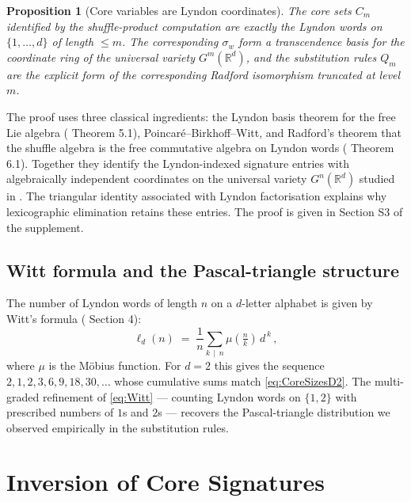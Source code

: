 \documentclass[11pt,english]{article}
\newtheorem{proposition}[theorem]{Proposition}
\theoremstyle{definition}
\theoremstyle{remark}
\begin{document}
\begin{proposition}[Core variables are Lyndon coordinates]
\label{prop:core-is-lyndon} The core sets $C_{m}$ identified by
the shuffle-product computation are exactly the Lyndon words on $\{1,\ldots,d\}$
of length $\leq m$. The corresponding $\sigma_{w}$ form a transcendence
basis for the coordinate ring of the universal variety $G^{m}(\mathbb{R}^{d})$,
and the substitution rules $Q_{m}$ are the explicit form of the corresponding
Radford isomorphism truncated at level $m$.
\end{proposition}

The proof uses three classical ingredients: the Lyndon basis theorem
for the free Lie algebra (\cite{Reutenauer} Theorem 5.1), Poincaré--Birkhoff--Witt,
and Radford's theorem that the shuffle algebra is the free commutative
algebra on Lyndon words (\cite{Reutenauer} Theorem 6.1). Together
they identify the Lyndon-indexed signature entries with algebraically
independent coordinates on the universal variety $G^{n}(\mathbb{R}^{d})$
studied in \cite{varieties}. The triangular identity associated with
Lyndon factorisation explains why lexicographic elimination retains
these entries. The proof is given in Section S3 of the supplement.

\subsection{Witt formula and the Pascal-triangle structure}

The number of Lyndon words of length $n$ on a $d$-letter alphabet
is given by Witt's formula (\cite{Reutenauer} Section 4):
\begin{equation}
\ell_{d}(n)\;=\;\frac{1}{n}\sum_{k\,\mid\,n}\mu\!\left(\tfrac{n}{k}\right)\,d^{\,k}\,,\label{eq:Witt}
\end{equation}
where $\mu$ is the Möbius function. For $d=2$ this gives the sequence
$2,1,2,3,6,9,18,30,\ldots$ whose cumulative sums match \eqref{eq:CoreSizesD2}.
The multi-graded refinement of \eqref{eq:Witt} --- counting Lyndon
words on $\{1,2\}$ with prescribed numbers of $1$s and $2$s --- recovers
the Pascal-triangle distribution we observed empirically in the substitution
rules.

\section{Inversion of Core Signatures\label{sec:Inversion}}
\end{document}
